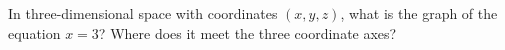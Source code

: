 In three-dimensional space with coordinates $(x,y,z)$, what is the graph of the equation $x=3$? Where does it meet the three coordinate axes?
